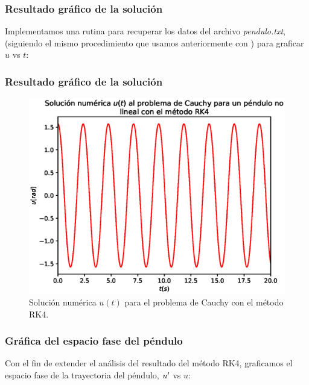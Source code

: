 \begin{frame}
\frametitle{Resultado gráfico de la solución}
Implementamos una rutina para recuperar los datos del archivo \emph{pendulo.txt}, (siguiendo el mismo procedimiento que usamos anteriormente con ) para graficar $u$ vs $t$:
\end{frame}
\begin{frame}
\frametitle{Resultado gráfico de la solución}
\begin{figure}[h!]
    \centering
    \includegraphics[scale=0.5]{Imagenes/metodo_RK4_pendulo_01.eps}
    \caption{Solución numérica $u(t)$ para el problema de Cauchy con el método RK4.}
    \label{fig_figura_12_pendulo01}
\end{figure}
\end{frame}
\begin{frame}
\frametitle{Gráfica del espacio fase del péndulo}
Con el fin de extender el análisis del resultado del método RK4, graficamos el espacio fase de la trayectoria del péndulo, ${u}^{\prime}$ vs $u$:
\end{frame}
